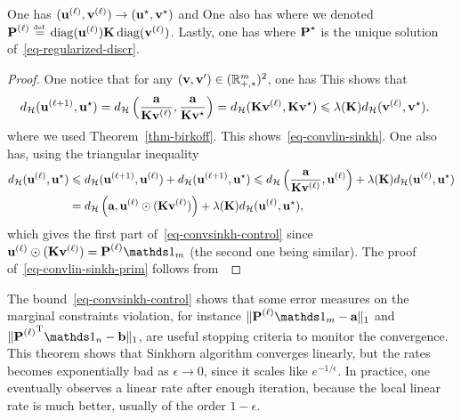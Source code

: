 \begin{thm}
	One has $(\it{\uD},\it{\vD}) \rightarrow (\uD^\star,\vD^\star)$ and
	One also has
	where we denoted $\it{\P} \eqdef \diag(\it{\uD}) \K \diag(\it{\vD})$. Lastly, one has
	\eql{\label{eq-convlin-sinkh-prim}
		\|\log(\it{\P}) - \log(\P^\star)\|_\infty \leq \Hilbert(\it{\uD}, \uD^\star) + \Hilbert(\it{\vD}, \vD^\star)
	}
	where $\P^\star$ is the unique solution of~\eqref{eq-regularized-discr}. 
\end{thm}

\begin{proof}
	One notice that for any $(\vD,\vD') \in (\RR_{+,*}^m)^2$, one has 
	This shows that
	\begin{align*}
		\Hilbert(\itt{\uD},\uD^\star) &= \Hilbert\pa{ \frac{\a}{\K \it{\vD}}, \frac{\a}{\K \vD^\star} } 
		= \Hilbert( \K \it{\vD}, \K \vD^\star ) \leq \la(\K) \Hilbert( \it{\vD}, \vD^\star ).
	\end{align*}
	where we used Theorem~\ref{thm-birkoff}. This shows~\eqref{eq-convlin-sinkh}.  One also has, using the triangular inequality
	\begin{align*}
		\Hilbert(\it{\uD},\uD^\star) &\leq \Hilbert(\itt{\uD},\it{\uD}) + \Hilbert(\itt{\uD},\uD^\star) 
		\leq \Hilbert\pa{ \frac{\a}{\K \it{\vD}},\it{\uD} } + \la(\K) \Hilbert(\it{\uD},\uD^\star) \\
		&= \Hilbert\pa{ \a,\it{\uD} \odot  ( \K \it{\vD} ) } + \la(\K) \Hilbert(\it{\uD},\uD^\star), 
	\end{align*}
	which gives the first part of~\eqref{eq-convsinkh-control} since 
	$\it{\uD} \odot  ( \K \it{\vD} ) = \it{\P}\ones_m$ (the second one being similar).
	The proof of~\eqref{eq-convlin-sinkh-prim} follows from~\cite[Lemma 3]{franklin1989scaling}
\end{proof}
 
The bound~\eqref{eq-convsinkh-control} shows that some error measures on the marginal constraints violation, for instance $\| \it{\P} \ones_m - \a \|_1$ and $\|\transp{\it{\P}} \ones_n - \b \|_1$, are useful stopping criteria to monitor the convergence. 
%
This theorem shows that Sinkhorn algorithm converges linearly, but the rates becomes exponentially bad as $\epsilon \rightarrow 0$, since it scales like $e^{-1/\epsilon}$. In practice, one eventually observes a linear rate after enough iteration, because the local linear rate is much better, usually of the order $1-\epsilon$. 

